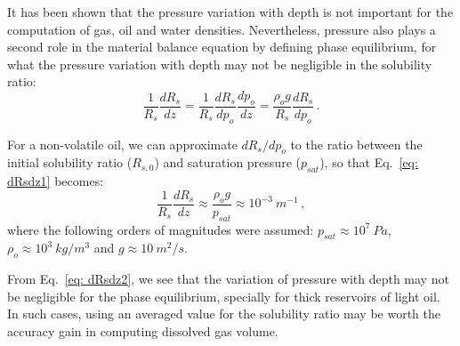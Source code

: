 \documentclass[authoryear,preprint,review,11pt]{elsarticle}
\begin{document}
It has been shown that the pressure variation with depth is not important for the computation of gas, oil and water densities. Nevertheless, pressure also plays a second role in the material balance equation by defining phase equilibrium, for what the pressure variation with depth may not be negligible in the solubility ratio: 
\begin{equation}\label{eq: dRsdz1}
\frac{1}{R_s}\frac{d R_s}{dz} = \frac{1}{R_s}\frac{d R_s}{dp_o} \frac{dp_o}{dz} = \frac{\rho_o g}{R_s}\frac{dR_s}{dp_o} \, .
\end{equation}

For a non-volatile oil, we can approximate $dR_s / dp_o$ to the ratio between the initial solubility ratio ($R_{s,0}$) and saturation pressure ($p_{sat}$), so that Eq.~\eqref{eq: dRsdz1} becomes:
\begin{equation}\label{eq: dRsdz2}
\frac{1}{R_s}\frac{d R_s}{dz} \approx \frac{\rho_o g }{p_{sat}} \approx 10^{-3}\ m^{-1} \, ,
\end{equation}
where the following orders of magnitudes were assumed: $p_{sat} \approx 10^{7}\ Pa$, $\rho_o \approx 10^{3}\ kg/m^3$ and $g \approx 10\ m^2/s$. 

From Eq.~\eqref{eq: dRsdz2}, we see that the variation of pressure with depth may not be negligible for the phase equilibrium,  specially for thick reservoirs of light oil. In such cases, using an averaged value for the solubility ratio may be worth the accuracy gain in computing dissolved gas volume.




\end{document}
